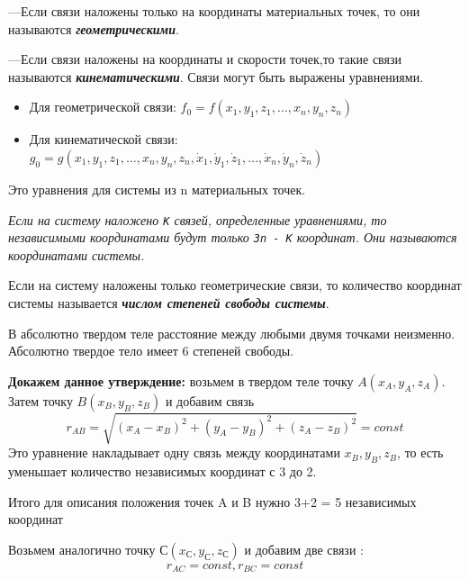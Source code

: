 \vspace{5px}

---Если связи наложены только на координаты материальных точек, то они называются \textbf{\textit{геометрическими}}.

\vspace{5px}

---Если связи наложены на координаты и скорости точек,то такие связи называются \textbf{\textit{кинематическими}}. Связи могут быть выражены уравнениями.
\begin{itemize}
    \item Для геометрической связи: $f_0 = f(x_1,y_1,z_1, \dots , x_n, y_n, z_n)$
    \item Для кинематической связи: $g_0 = g(x_1,y_1,z_1, \dots , x_n, y_n, z_n, \dot x_1,\dot y_1,\dot z_1, \dots , \dot x_n, \dot y_n,\dot z_n)$ %
\end{itemize}
Это уравнения для системы из n материальных точек.

\vspace{5px}

 \textit{Если на систему наложено \texttt{К} связей, определенные уравнениями, то независимыми координатами будут только \texttt{3n - K} координат. Они называются координатами системы.}

\vspace{5px}

 Если на систему наложены только геометрические связи, то количество координат системы называется \textbf{\textit{числом степеней свободы системы}}.

\vspace{5px}

В абсолютно твердом теле расстояние между любыми двумя точками неизменно. Абсолютно твердое тело имеет 6 степеней свободы.

\vspace{6px}

\textbf{Докажем данное утверждение:} возьмем в твердом теле точку $ A(x_A,y_A,z_A)$. Затем точку $ B(x_{B},y_{B},z_{B})$ и добавим связь \[ r_{AB} = \sqrt{(x_A-x_B)^2 + (y_A-y_B)^2 + (z_A-z_B)^2} = const \]
Это уравнение накладывает одну связь между координатами $x_B, y_B,z_B$, то есть уменьшает количество независимых координат с 3 до 2.

Итого для описания положения точек A и B нужно 3+2 = 5 независимых координат

Возьмем аналогично точку $ С(x_{С},y_{С},z_{С})$ и добавим две связи : \[ r_{AC} = const, r_{BC} = const \] %

